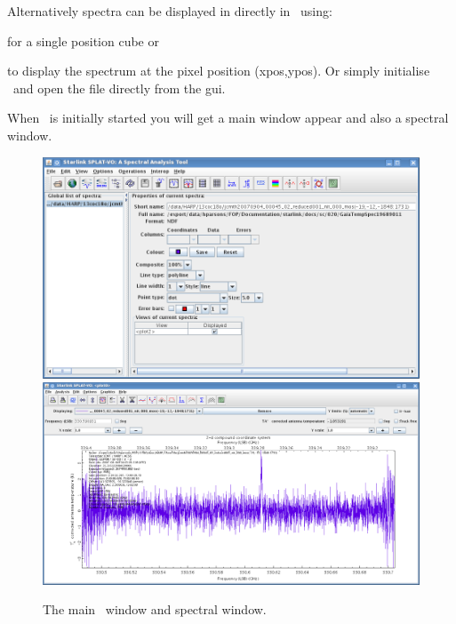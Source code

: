 \documentclass[11pt,oneside,chapters]{starlink}
\begin{document}
Alternatively spectra can be displayed in directly in \splat\ using:

\begin{terminalv}
\end{terminalv}

for a single position cube or

\begin{terminalv}
\end{terminalv}

to display the spectrum at the pixel position (xpos,ypos). Or simply
initialise \splat\ and open the file directly from the gui.

\begin{terminalv}
\end{terminalv}

When \splat\ is initially started you will get a main window appear
and also a spectral window.

\begin{figure}[h!]
\begin{center}
\includegraphics[width=0.7\linewidth]{sc20_splat_window}
\includegraphics[width=0.6\linewidth]{sc20_splat_spectrum}
\caption[The main \splat\ window and spectrum window.]{\label{fig:splat_window}
  The main \splat\ window and spectral window.}
\end{center}
\end{figure}
\end{document}

